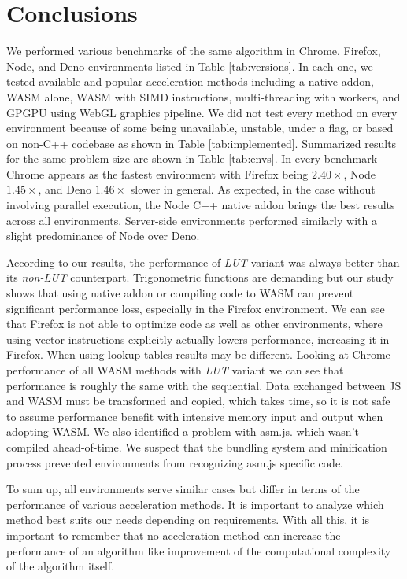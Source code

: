 \section{Conclusions}\label{sec:conclusions}
We performed various benchmarks of the same algorithm in Chrome, Firefox, Node, and Deno environments listed in Table \ref{tab:versions}. In each one, we tested available and popular acceleration methods including a native addon, WASM alone, WASM with SIMD instructions, multi-threading with workers, and GPGPU using \mbox{WebGL} graphics pipeline. We did not test every method on every environment because of some being unavailable, unstable, under a flag, or based on non-C++ codebase as shown in Table \ref{tab:implemented}. Summarized results for the same problem size are shown in Table \ref{tab:envs}.
In every benchmark Chrome appears as the fastest environment with Firefox being $2.40\times$, Node $1.45\times$, and Deno $1.46\times$ slower in general. As expected, in the case without involving parallel execution, the Node C++ native addon brings the best results across all environments. Server-side environments performed similarly with a slight predominance of Node over Deno.

According to our results, the performance of \textit{LUT} variant was always better than its \textit{non-LUT} counterpart. Trigonometric functions are demanding but our study shows that using native addon or compiling code to WASM can prevent significant performance loss, especially in the Firefox environment. We can see that Firefox is not able to optimize code as well as other environments, where using vector instructions explicitly actually lowers performance, increasing it in Firefox.
When using lookup tables results may be different. Looking at Chrome performance of all WASM methods with \textit{LUT} variant we can see that performance is roughly the same with the sequential. Data exchanged between JS and WASM must be transformed and copied, which takes time, so it is not safe to assume performance benefit with intensive memory input and output when adopting WASM.
We also identified a problem with asm.js. which wasn't compiled ahead-of-time. We suspect that the bundling system and minification process prevented environments from recognizing asm.js specific code. 

To sum up, all environments serve similar cases but differ in terms of the performance of various acceleration methods. It is important to analyze which method best suits our needs depending on requirements. 
With all this, it is important to remember that no acceleration method can increase the performance of an algorithm like improvement of the computational complexity of the algorithm itself.




